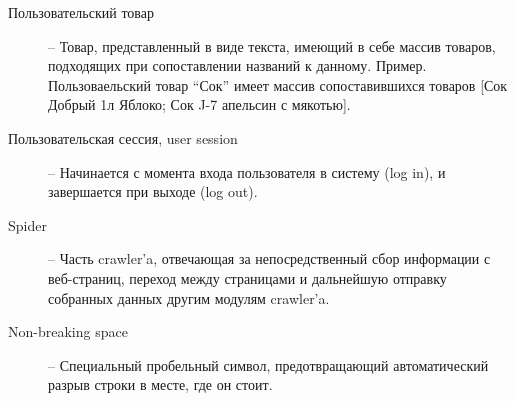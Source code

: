 \begin{description}
    \item[Пользовательский товар] --
            Товар, представленный в виде текста, имеющий в себе массив товаров,
            подходящих при сопоставлении названий к данному. Пример.
            Пользоваельский товар ``Сок'' имеет массив сопоставившихся товаров [Сок
            Добрый 1л Яблоко; Сок J-7 апельсин с мякотью].

    \item[Пользовательская сессия, user session] --
           Начинается с момента входа пользователя в систему (log in), и завершается при выходе (log out).

    \item[Spider] --
        Часть crawler'a, отвечающая за непосредственный сбор информации с
        веб-страниц, переход между страницами и дальнейшую отправку собранных
        данных другим модулям crawler'a.

    \item[Non-breaking space] -- 
        Специальный пробельный символ, предотвращающий автоматический разрыв
        строки в месте, где он стоит.

\end{description}

